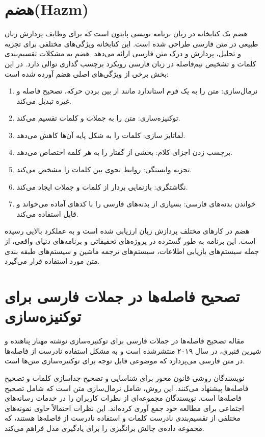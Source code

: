 \section{ هضم(Hazm)}
\hspace{30pt}
هضم یک کتابخانه در زبان برنامه نویسی پایتون است که برای وظایف پردازش زبان طبیعی در متن فارسی طراحی شده است. این کتابخانه ویژگی‌های مختلفی برای تجزیه و تحلیل، پردازش و درک متن فارسی ارائه می‌دهد.
هضم به مشکلات تقسیم‌بندی کلمات و تشخیص نیم‌فاصله در زبان فارسی رویکرد برچسب گذاری توالی دارد. در این بخش برخی از ویژگی‌های اصلی هضم آورده شده است:
\begin{enumerate}
    \item نرمال‌سازی: متن را به یک فرم استاندارد مانند از بین بردن حرکه، تصحیح فاصله و غیره تبدیل می‌کند.
     \item توکنیزه‌سازی: متن را به جملات و کلمات تقسیم می‌کند.
      \item لماتایز سازی: کلمات را به شکل پایه آن‌ها کاهش می‌دهد.
       \item  برچسب زدن اجزای کلام: بخشی از گفتار را به هر کلمه اختصاص می‌دهد.
        \item تجزیه وابستگی: روابط نحوی بین کلمات را مشخص می‌کند.
         \item نگاشتگری: بازنمایی بردار از کلمات و جملات ایجاد می‌کند.
          \item خواندن بدنه‌های فارسی: بسیاری از بدنه‌های فارسی را با کدهای آماده می‌خواند و قابل استفاده می‌کند.
\end{enumerate}

هضم در کارهای مختلف پردازش زبان ارزیابی شده است و به عملکرد بالایی رسیده است. این برنامه به طور گسترده در پروژه‌های تحقیقاتی و برنامه‌های دنیای واقعی‌، از جمله سیستم‌های بازیابی اطلاعات، سیستم‌های ترجمه ماشین و سیستم‌های طبقه بندی متن مورد استفاده قرار می‌گیرد.\cite{hazm}

\section{تصحیح فاصله‌ها در جملات فارسی برای توکنیزه‌سازی}
\hspace{30pt}
مقاله تصحیح فاصله‌ها در جملات فارسی برای توکنیزه‌سازی نوشته مهناز پناهنده و شیرین قنبری، در سال ۲۰۱۹ منتشر‌شده است و به مشکل استفاده نادرست از فاصله‌ها در متن فارسی می‌پردازد که موضوعی قابل توجه برای توکنیزه‌سازی متن‌ها است.

نویسندگان روشی قانون محور برای شناسایی و تصحیح جداسازی کلمات و تصحیح فاصله‌ها پیشنهاد می‌کنند. این روش، شامل نرمال‌سازی متن است که شامل تصحیح فاصله‌ها است.  نویسندگان مجموعه‌ای از نظرات کاربران را در خدمات رسانه‌های اجتماعی برای مطالعه خود جمع آوری کرده‌اند. این نظرات احتمالاً حاوی نمونه‌های مختلفی از تقسیم‌بندی نادرست کلمات و استفاده نادرست از فاصله‌ها هستند، که مجموعه داده‌‌ی چالش برانگیزی را برای یادگیری مدل فراهم می‌کند.

